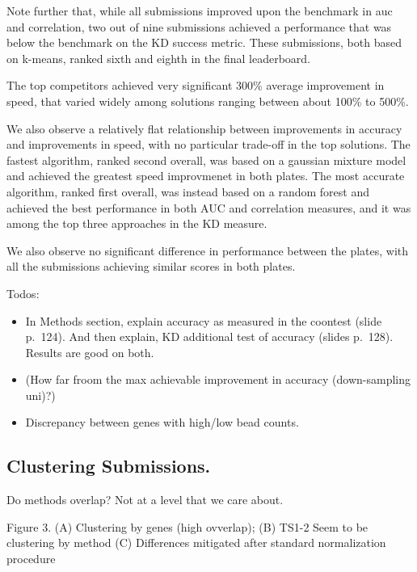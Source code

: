 \documentclass[]{article}
\providecommand{\tightlist}{%
  \setlength{\itemsep}{0pt}\setlength{\parskip}{0pt}}
\begin{document}
Note further that, while all submissions improved upon the benchmark in
auc and correlation, two out of nine submissions achieved a performance
that was below the benchmark on the KD success metric. These
submissions, both based on k-means, ranked sixth and eighth in the final
leaderboard.

The top competitors achieved very significant 300\% average improvement
in speed, that varied widely among solutions ranging between about 100\%
to 500\%.

We also observe a relatively flat relationship between improvements in
accuracy and improvements in speed, with no particular trade-off in the
top solutions. The fastest algorithm, ranked second overall, was based
on a gaussian mixture model and achieved the greatest speed improvmenet
in both plates. The most accurate algorithm, ranked first overall, was
instead based on a random forest and achieved the best performance in
both AUC and correlation measures, and it was among the top three
approaches in the KD measure.

We also observe no significant difference in performance between the
plates, with all the submissions achieving similar scores in both
plates.

\color{red}

Todos:

\begin{itemize}
\tightlist
\item
  In Methods section, explain accuracy as measured in the coontest
  (slide p.~124). And then explain, KD additional test of accuracy
  (slides p.~128). Results are good on both.
\item
  (How far froom the max achievable improvement in accuracy
  (down-sampling uni)?)
\item
  Discrepancy between genes with high/low bead counts.
\end{itemize}

\color{black}

\hypertarget{clustering-submissions.}{%
\subsection{Clustering Submissions.}\label{clustering-submissions.}}

Do methods overlap? Not at a level that we care about.

Figure 3. (A) Clustering by genes (high ovverlap); (B) TS1-2 Seem to be
clustering by method (C) Differences mitigated after standard
normalization procedure
\end{document}

